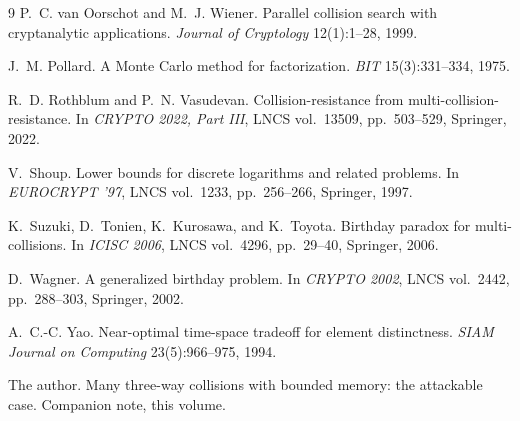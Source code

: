 \documentclass[11pt]{article}
\theoremstyle{plain}
\theoremstyle{definition}
\begin{document}
\begin{thebibliography}{9}
P.~C. van Oorschot and M.~J. Wiener.
\newblock Parallel collision search with cryptanalytic applications.
\newblock \emph{Journal of Cryptology} 12(1):1--28, 1999.

J.~M. Pollard.
\newblock A Monte Carlo method for factorization.
\newblock \emph{BIT} 15(3):331--334, 1975.

R.~D. Rothblum and P.~N. Vasudevan.
\newblock Collision-resistance from multi-collision-resistance.
\newblock In \emph{CRYPTO 2022, Part III}, LNCS vol.~13509,
  pp.~503--529, Springer, 2022.

V.~Shoup.
\newblock Lower bounds for discrete logarithms and related problems.
\newblock In \emph{EUROCRYPT '97}, LNCS vol.~1233, pp.~256--266,
  Springer, 1997.

K.~Suzuki, D.~Tonien, K.~Kurosawa, and K.~Toyota.
\newblock Birthday paradox for multi-collisions.
\newblock In \emph{ICISC 2006}, LNCS vol.~4296, pp.~29--40, Springer,
  2006.

D.~Wagner.
\newblock A generalized birthday problem.
\newblock In \emph{CRYPTO 2002}, LNCS vol.~2442, pp.~288--303, Springer,
  2002.

A.~C.-C. Yao.
\newblock Near-optimal time-space tradeoff for element distinctness.
\newblock \emph{SIAM Journal on Computing} 23(5):966--975, 1994.

The author.
\newblock Many three-way collisions with bounded memory: the attackable
  case.
\newblock Companion note, this volume.

\end{thebibliography}
\end{document}
